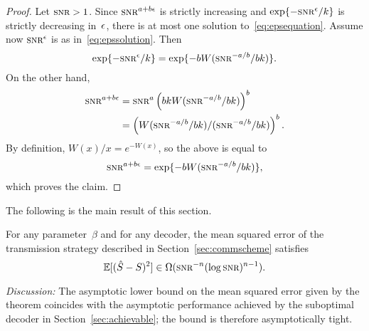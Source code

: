 \begin{proof}
  Let $\snr>1$. Since $\snr^{a+b\e}$ is strictly increasing and
  $\exp\{-\snr^\e/k\}$ is strictly decreasing in~$\epsilon$, there is at most one
  solution to~\eqref{eq:epsequation}.  Assume now $\snr^\e$ is as
  in~\eqref{eq:epssolution}. Then
  \begin{equation*}
    \exp\{-\snr^\e/k\} = \exp\{-b W(\snr^{-a/b}/bk)\}.
  \end{equation*}
  On the other hand,
  \begin{align*}
    \snr^{a+b\e} &= \snr^a \left( bk W(\snr^{-a/b}/bk) \right)^b \\
    &= \left( W(\snr^{-a/b}/bk) / (\snr^{-a/b}/bk) \right)^b.
  \end{align*}
  By definition, $W(x)/x = e^{-W(x)}$, so the above is equal to
  \begin{equation*}
    \snr^{a+b\e} = \exp\{-bW(\snr^{-a/b}/bk)\},
  \end{equation*}
  which proves the claim.
\end{proof}

The following is the main result of this section.
\begin{theorem}
  \label{thm:scalinglb}
  For any parameter~$\beta$ and for any decoder, the mean squared error of the
  transmission strategy described in Section~\ref{sec:commscheme} satisfies
  \begin{equation*}
    \mse \in \Omega(\snr^{-n}(\log\snr)^{n-1}).
  \end{equation*}
\end{theorem}

\emph{Discussion:} The asymptotic lower bound on the mean squared error given by
the theorem coincides with the asymptotic performance achieved by the suboptimal
decoder in Section~\ref{sec:achievable}; the bound is therefore asymptotically
tight. 

